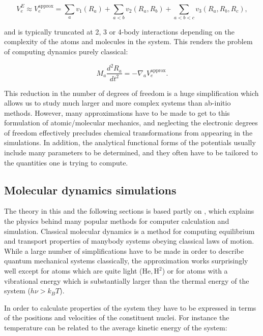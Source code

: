 \begin{equation}
 V_e^E \approx V_e^{\text{approx}} =
    \sum_a v_1(R_a) + \sum_{a < b} v_2(R_a, R_b)
    + \sum_{a < b < c} v_3(R_a, R_b, R_c) , 
\end{equation}

and is typically truncated at 2, 3 or 4-body interactions
depending on the complexity of the atoms and molecules in the system.
This renders the problem of computing dynamics purely classical:

\begin{equation}
 M_a \frac{d^2 R_a}{dt^2} = -\nabla_a V_e^{\text{approx}} . 
\end{equation}

This reduction in the number of degrees of freedom is a huge simplification
which allows us to study much larger and more complex systems
than ab-initio methods. However, many approximations have to be made
to get to this formulation of atomic/molecular mechanics, and neglecting
the electronic degrees of freedom effectively precludes chemical
transformations from appearing in the simulations.
In addition, the analytical functional forms of the potentials
usually include many parameters to be determined,
and they often have to be tailored to the quantities
one is trying to compute.

\subsection{Molecular dynamics simulations}
The theory in this and the following sections
is based partly on \parencite[Frenkel, Daan
and Smit, Berend][pages 63-107]{frenkel2001understanding},
which explains the physics behind many popular methods 
for computer calculation and simulation.
Classical molecular dynamics is a method
for computing equilibrium and transport properties
of manybody systems obeying classical laws of motion.
While a large number of simplifications have to be made
in order to describe quantum mechanical systems classically,
the approximation works surprisingly well
except for atoms which are quite light ($\text{He}, \text{H}^2$)
or for atoms with a vibrational energy
which is substantially larger than the thermal energy
of the system ($h\nu > k_B T$).
\par
In order to calculate properties of the system
they have to be expressed in terms of the positions
and velocities of the constituent nuclei.
For instance the temperature can be related
to the average kinetic energy of the system:

